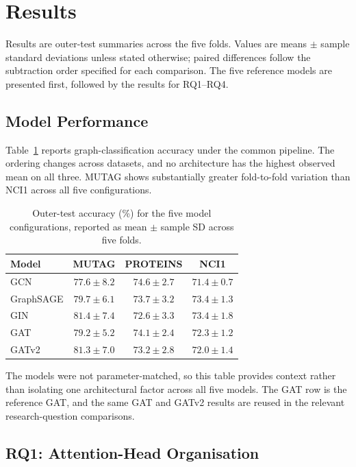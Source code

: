 \documentclass[11pt,a4paper]{article}
\begin{document}
\clearpage
\section{Results}
\label{sec:results}

Results are outer-test summaries across the five folds. Values are means \(\pm\) sample standard deviations unless stated otherwise; paired differences follow the subtraction order specified for each comparison. The five reference models are presented first, followed by the results for RQ1--RQ4.

\subsection{Model Performance}
\label{sec:results-models}

Table~\ref{tab:model-performance} reports graph-classification accuracy under the common pipeline. The ordering changes across datasets, and no architecture has the highest observed mean on all three. MUTAG shows substantially greater fold-to-fold variation than NCI1 across all five configurations.

\begin{table}[!ht]
\centering
\caption{Outer-test accuracy (\%) for the five model configurations, reported as mean \(\pm\) sample SD across five folds.}
\label{tab:model-performance}
\begin{tabular}{@{}lccc@{}}
\toprule
Model & MUTAG & PROTEINS & NCI1\\
\midrule
GCN & \(77.6\pm8.2\) & \(74.6\pm2.7\) & \(71.4\pm0.7\)\\
GraphSAGE & \(79.7\pm6.1\) & \(73.7\pm3.2\) & \(73.4\pm1.3\)\\
GIN & \(81.4\pm7.4\) & \(72.6\pm3.3\) & \(73.4\pm1.8\)\\
GAT & \(79.2\pm5.2\) & \(74.1\pm2.4\) & \(72.3\pm1.2\)\\
GATv2 & \(81.3\pm7.0\) & \(73.2\pm2.8\) & \(72.0\pm1.4\)\\
\bottomrule
\end{tabular}
\end{table}

The models were not parameter-matched, so this table provides context rather than isolating one architectural factor across all five models. The GAT row is the reference GAT, and the same GAT and GATv2 results are reused in the relevant research-question comparisons.

\subsection{RQ1: Attention-Head Organisation}
\label{sec:results-rq1}
\end{document}
